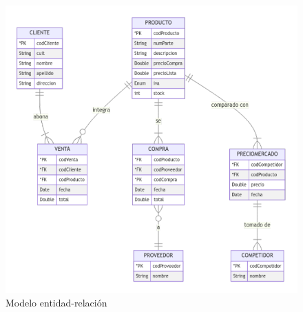 \begin{figure}[ht]
	\centering
	\includegraphics[width=\textwidth]{img/02-modelo-entidad-relacion}
	\caption{Modelo entidad-relación}
\end{figure}